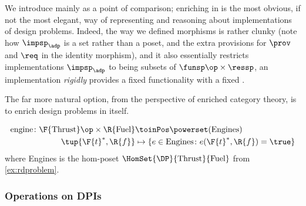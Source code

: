 We introduce \DPI mainly as a point of comparison; enriching in \Set is the most obvious, if not the most elegant, way of representing and reasoning about implementations of design problems. Indeed, the way we defined morphisms is rather clunky (note how $\impsp_\adp$ is a set rather than a poset, and the extra provisions for $\prov$ and $\req$ in the identity morphism), and it also essentially restricts implementations $\impsp_\adp$ to being subsets of $\funsp\op \times \ressp$, \ie  an implementation \emph{rigidly} provides a fixed functionality \fun with a fixed \res.

The far more natural option, from the perspective of enriched category theory, is to enrich design problems in \DP itself.

\begin{example}
  \begin{equation}
    \begin{aligned}
      \text{engine} \colon \F{\text{Thrust}}\op \times \R{\text{Fuel}} &\toinPos \powerset(\text{Engines}) \\
      \tup{\F{t}^*,\R{f}} &\mapsto \{ e \in \text{Engines} \colon e(\F{t}^*, \R{f}) = \true \}
    \end{aligned}
  \end{equation}
  where Engines is the hom-poset $\HomSet{\DP}{\text{Thrust}}{\text{Fuel}}$ from \cref{ex:rdproblem}.
\end{example}

\subsubsection{Operations on DPIs}




